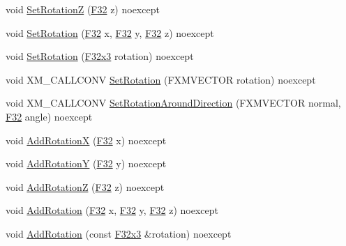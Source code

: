 \begin{DoxyCompactItemize}
\item 
void \mbox{\hyperlink{classmage_1_1_local_transform_a1dcec183b2f7ebf3fc7eb4ab574ca045}{Set\+RotationZ}} (\mbox{\hyperlink{namespacemage_aa97e833b45f06d60a0a9c4fc22ae02c0}{F32}} z) noexcept
\item 
void \mbox{\hyperlink{classmage_1_1_local_transform_a7f6fbefa501a2111a07d532a823fba6e}{Set\+Rotation}} (\mbox{\hyperlink{namespacemage_aa97e833b45f06d60a0a9c4fc22ae02c0}{F32}} x, \mbox{\hyperlink{namespacemage_aa97e833b45f06d60a0a9c4fc22ae02c0}{F32}} y, \mbox{\hyperlink{namespacemage_aa97e833b45f06d60a0a9c4fc22ae02c0}{F32}} z) noexcept
\item 
void \mbox{\hyperlink{classmage_1_1_local_transform_aad6d2bf0eba13e47e90023edcdc55c47}{Set\+Rotation}} (\mbox{\hyperlink{namespacemage_a0fef5ab4e073c2d9ea876fefa3da4233}{F32x3}} rotation) noexcept
\item 
void X\+M\+\_\+\+C\+A\+L\+L\+C\+O\+NV \mbox{\hyperlink{classmage_1_1_local_transform_a470961f6e4f3b0920742489722ca791e}{Set\+Rotation}} (F\+X\+M\+V\+E\+C\+T\+OR rotation) noexcept
\item 
void X\+M\+\_\+\+C\+A\+L\+L\+C\+O\+NV \mbox{\hyperlink{classmage_1_1_local_transform_a366b1cbd069bce035a868a8800dc04e9}{Set\+Rotation\+Around\+Direction}} (F\+X\+M\+V\+E\+C\+T\+OR normal, \mbox{\hyperlink{namespacemage_aa97e833b45f06d60a0a9c4fc22ae02c0}{F32}} angle) noexcept
\item 
void \mbox{\hyperlink{classmage_1_1_local_transform_ab9d98b568a7384896857e2d6e72342db}{Add\+RotationX}} (\mbox{\hyperlink{namespacemage_aa97e833b45f06d60a0a9c4fc22ae02c0}{F32}} x) noexcept
\item 
void \mbox{\hyperlink{classmage_1_1_local_transform_adea3848a1d4d83a836d33668f323bb4d}{Add\+RotationY}} (\mbox{\hyperlink{namespacemage_aa97e833b45f06d60a0a9c4fc22ae02c0}{F32}} y) noexcept
\item 
void \mbox{\hyperlink{classmage_1_1_local_transform_ac769e25872e8a738bd6189f2ca6db4ea}{Add\+RotationZ}} (\mbox{\hyperlink{namespacemage_aa97e833b45f06d60a0a9c4fc22ae02c0}{F32}} z) noexcept
\item 
void \mbox{\hyperlink{classmage_1_1_local_transform_af4f3c10c99796ed8b71841bfd94e578d}{Add\+Rotation}} (\mbox{\hyperlink{namespacemage_aa97e833b45f06d60a0a9c4fc22ae02c0}{F32}} x, \mbox{\hyperlink{namespacemage_aa97e833b45f06d60a0a9c4fc22ae02c0}{F32}} y, \mbox{\hyperlink{namespacemage_aa97e833b45f06d60a0a9c4fc22ae02c0}{F32}} z) noexcept
\item 
void \mbox{\hyperlink{classmage_1_1_local_transform_a388e221978d1d8fb384ca1728301d4ab}{Add\+Rotation}} (const \mbox{\hyperlink{namespacemage_a0fef5ab4e073c2d9ea876fefa3da4233}{F32x3}} \&rotation) noexcept

\end{DoxyCompactItemize}
